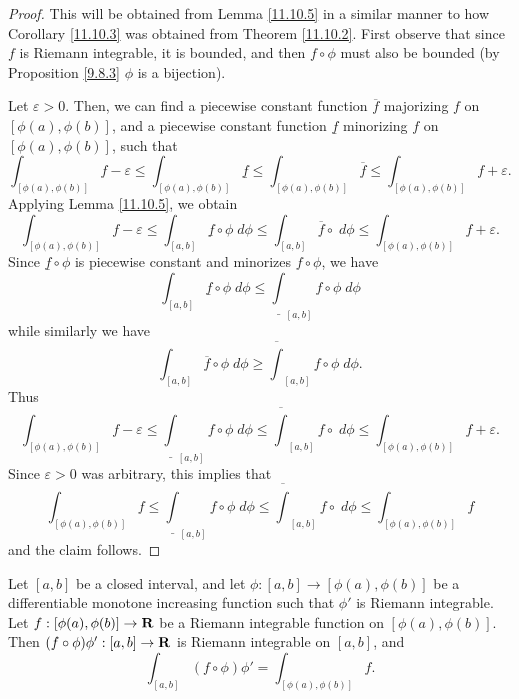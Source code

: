\begin{proof}
    This will be obtained from Lemma \ref{11.10.5} in a similar manner to how Corollary \ref{11.10.3} was obtained from Theorem \ref{11.10.2}.
    First observe that since \(f\) is Riemann integrable, it is bounded, and then \(f \circ \phi\) must also be bounded (by Proposition \ref{9.8.3} \(\phi\) is a bijection).

    Let \(\varepsilon > 0\).
    Then, we can find a piecewise constant function \(\overline{f}\) majorizing \(f\) on \([\phi(a), \phi(b)]\), and a piecewise constant function \(\underline{f}\) minorizing \(f\) on \([\phi(a), \phi(b)]\), such that
    \[
        \int_{[\phi(a), \phi(b)]} f - \varepsilon \leq \int_{[\phi(a), \phi(b)]} \underline{f} \leq \int_{[\phi(a), \phi(b)]} \overline{f} \leq \int_{[\phi(a), \phi(b)]} f + \varepsilon.
    \]
    Applying Lemma \ref{11.10.5}, we obtain
    \[
        \int_{[\phi(a), \phi(b)]} f - \varepsilon \leq \int_{[a, b]} \underline{f} \circ \phi \; d \phi \leq \int_{[a, b]} \overline{f} \circ \; d \phi \leq \int_{[\phi(a), \phi(b)]} f + \varepsilon.
    \]
    Since \(\underline{f} \circ \phi\) is piecewise constant and minorizes \(f \circ \phi\), we have
    \[
        \int_{[a, b]} \underline{f} \circ \phi \; d \phi \leq \underline{\int}_{[a, b]} f \circ \phi \; d \phi
    \]
    while similarly we have
    \[
        \int_{[a, b]} \overline{f} \circ \phi \; d \phi \geq \overline{\int}_{[a, b]} f \circ \phi \; d \phi.
    \]
    Thus
    \[
        \int_{[\phi(a), \phi(b)]} f - \varepsilon \leq \underline{\int}_{[a, b]} f \circ \phi \; d \phi \leq \overline{\int}_{[a, b]} f \circ \; d \phi \leq \int_{[\phi(a), \phi(b)]} f + \varepsilon.
    \]
    Since \(\varepsilon > 0\) was arbitrary, this implies that
    \[
        \int_{[\phi(a), \phi(b)]} f \leq \underline{\int}_{[a, b]} f \circ \phi \; d \phi \leq \overline{\int}_{[a, b]} f \circ \; d \phi \leq \int_{[\phi(a), \phi(b)]} f
    \]
    and the claim follows.
\end{proof}

\begin{proposition}\label{11.10.7}
    Let \([a, b]\) be a closed interval, and let \(\phi : [a, b] \to [\phi(a), \phi(b)]\) be a differentiable monotone increasing function such that \(\phi'\) is Riemann integrable.
    Let \(f : [\phi(a), \phi(b)] \to \mathbf{R}\) be a Riemann integrable function on \([\phi(a), \phi(b)]\).
    Then \((f \circ \phi) \phi' : [a, b] \to \mathbf{R}\) is Riemann integrable on \([a, b]\), and
    \[
        \int_{[a, b]} (f \circ \phi) \phi' = \int_{[\phi(a), \phi(b)]} f.
    \]
\end{proposition}

